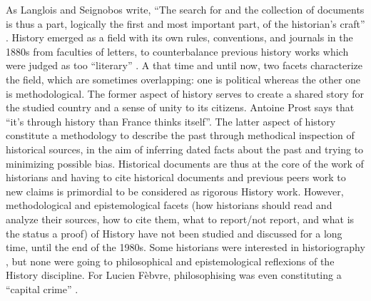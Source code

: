 As Langlois and Seignobos write, ``The search for and the collection of documents is thus a part, logically the first and most important part, of the historian's craft'' \cite{langloisIntroductionAuxÉtudes2014}.
History emerged as a field with its own rules, conventions, and journals in the 1880s from faculties of letters, to counterbalance previous history works which were judged as too ``literary'' \cite{noirielNaissanceMétierHistorien1990}.
A that time and until now, two facets characterize the field, which are sometimes overlapping: one is political whereas the other one is methodological.
The former aspect of history serves to create a shared story for the studied country and a sense of unity to its citizens.
Antoine Prost says that ``it's through history than France thinks itself''\cite{prost2014}.
The latter aspect of history constitute a methodology to describe the past through methodical inspection of historical sources, in the aim of inferring dated facts about the past and trying to minimizing possible bias.
Historical documents are thus at the core of the work of historians and having to cite historical documents and previous peers work to new claims is primordial to be considered as rigorous History work.
However, methodological and epistemological facets (how historians should read and analyze their sources, how to cite them, what to report/not report, and what is the status a proof) of History have not been studied and discussed for a long time, until the end of the 1980s.
Some historians were interested in historiography \cite{carbonellHistoriographie1981}, but none were going to philosophical and epistemological reflexions of the History discipline.
For Lucien Fèbvre, philosophising was even constituting a ``capital crime'' \cite{febvreVERSAUTREHISTOIRE1949, prost2014}.

